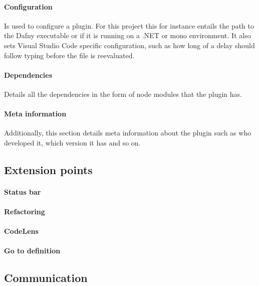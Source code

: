 \paragraph{Configuration}
Is used to configure a plugin. For this project this for instance entails the path to the Dafny executable or if it is running on a .NET or mono environment. It also sets Visual Studio Code specific configuration, such as how long of a delay should follow typing before the file is reevaluated.

\paragraph{Dependencies}
Details all the dependencies in the form of node modules that the plugin has.

\paragraph{Meta information}
Additionally, this section details meta information about the plugin such as who developed it, which version it has and so on.






\subsection{Extension points}

\paragraph{Status bar}

\paragraph{Refactoring}

\paragraph{CodeLens}

\paragraph{Go to definition}

\subsection{Communication}

